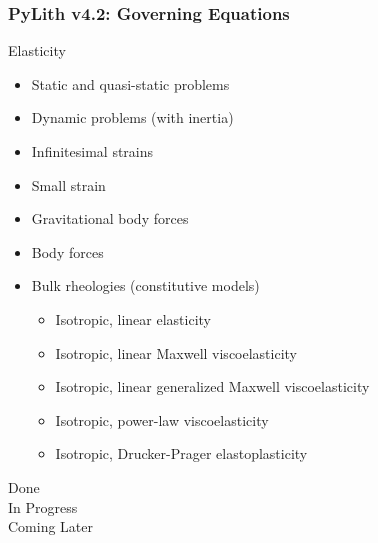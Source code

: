 \documentclass[aspectratio=169]{beamer}
\begin{document}
\newcommand{\statuslater}[1]{{\color{purple}#1}}
\newcommand{\statusdone}[1]{{\color{green}#1}}
\newcommand{\statusbuggy}[1]{{\color{red}#1}}
\newcommand{\statusinprogress}[1]{{\color{orange}#1}}
\begin{frame}
  \frametitle{PyLith v4.2: Governing Equations}
  \summary{}

  Elasticity
  \begin{itemize}
  \item \statusdone{Static and quasi-static problems}
  \item \statusinprogress{Dynamic problems (with inertia)}
  \item \statusdone{Infinitesimal strains}
  \item \statusinprogress{Small strain}
  \item \statusdone{Gravitational body forces}
  \item \statusdone{Body forces}
  \item Bulk rheologies (constitutive models)
    \begin{itemize}
    \item \statusdone{Isotropic, linear elasticity}
    \item \statusdone{Isotropic, linear Maxwell viscoelasticity}
    \item \statusdone{Isotropic, linear generalized Maxwell viscoelasticity}
    \item \statusdone{Isotropic, power-law viscoelasticity}
    \item \statusinprogress{Isotropic, Drucker-Prager elastoplasticity}
    \end{itemize}
  \end{itemize}
  \hfill%
  \begin{minipage}{0.25\textwidth}
    \statusdone{Done}\\
    \statusinprogress{In Progress}\\
    \statuslater{Coming Later}
  \end{minipage}  
\end{frame}
\end{document}
